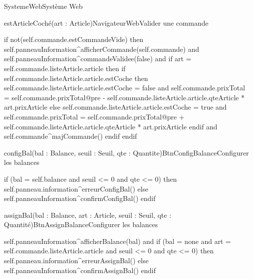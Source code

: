 \begin{OM}{SystemeWeb}{Système Web}
    \begin{OMOperation}{estArticleCoché(art : Article)}{NavigateurWeb}{Valider une commande}
        \begin{OMMessages}
        \end{OMMessages}
        \OMNoPre
        \begin{OMPost}
if not(self.commande.estCommandeVide) then
    self.panneauInformation^afficherCommande(self.commande)
    and
    self.panneauInformation^commandeValidee(false)
    and
    if art = self.commande.listeArticle.article then
        if self.commande.listeArticle.article.estCoche then
            self.commande.listeArticle.article.estCoche = false
            and
            self.commande.prixTotal = self.commande.prixTotal@pre - self.commande.listeArticle.article.qteArticle * art.prixArticle
        else
            self.commande.listeArticle.article.estCoche = true
            and
            self.commande.prixTotal = self.commande.prixTotal@pre + self.commande.listeArticle.article.qteArticle * art.prixArticle
        endif
        and
        self.commande^majCommande()
    endif
endif
        \end{OMPost}
    \end{OMOperation}

    \begin{OMOperation}{configBal(bal : Balance, seuil : Seuil, qte : Quantite)}{BtnConfigBalance}{Configurer les balances}
        \begin{OMMessages}
        \end{OMMessages}
        \OMNoPre
        \begin{OMPost}
if (bal = self.balance and seuil <= 0 and qte <= 0) then
    self.panneau.information^erreurConfigBal()
else
    self.panneauInformation^confirmConfigBal()
endif
        \end{OMPost}
    \end{OMOperation}

    \begin{OMOperation}{assignBal(bal : Balance, art : Article, seuil : Seuil, qte : Quantité)}{BtnAssignBalance}{Configurer les balances}
        \begin{OMMessages}
        \end{OMMessages}
        \OMNoPre
        \begin{OMPost}
self.panneauInformation^afficherBalance(bal)
and
if (bal = none and art = self.commande.listeArticle.article and seuil <= 0 and qte <= 0) then
    self.panneau.information^erreurAssignBal()
else
    self.panneauInformation^confirmAssignBal()
endif
        \end{OMPost}
    \end{OMOperation}
\end{OM}
